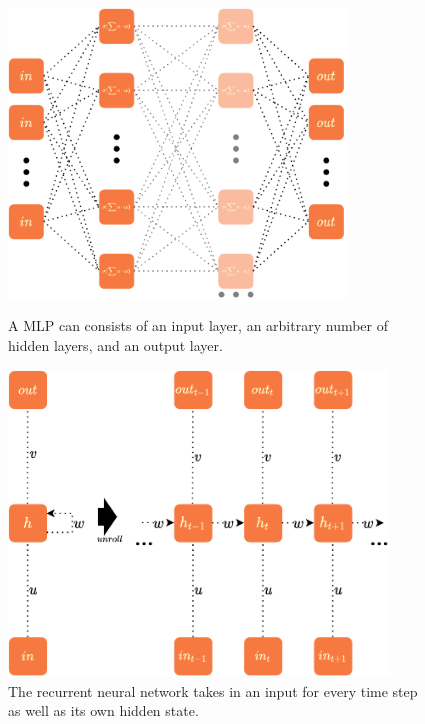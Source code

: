 \documentclass[a4paper,cleardoubleempty,BCOR1cm, 11pt]{report}
\begin{document}
\begin{figure}
	\centering
	\begin{minipage}[t]{0.45\textwidth}
		\centering
		\includegraphics[width=0.8\textwidth,height=0.21\textheight]{images/mlp.pdf} 
		\caption{A MLP can consists of an input layer, an arbitrary number of hidden layers, and an output layer.}
	\end{minipage}\hfill
	\begin{minipage}[t]{0.45\textwidth}
		\centering
		\includegraphics[width=0.9\textwidth,height=0.20\textheight]{images/rnn.pdf}
		\caption{The recurrent neural network takes in an input for every time step as well as its own hidden state.}
		\label{fig:rnn}
	\end{minipage}
\end{figure}
\end{document}
